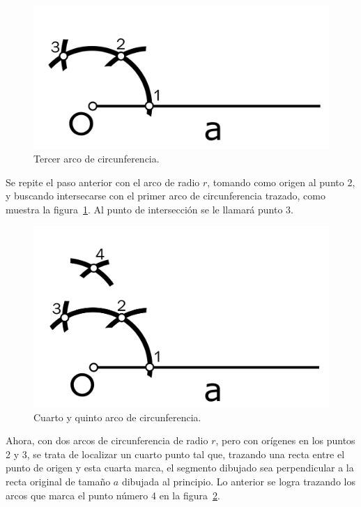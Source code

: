 \begin{figure}[H]
\centering
\includegraphics[scale=0.95]{Figures/Cuad4}
\caption[Tercer arco de circunferencia.]{Tercer arco de circunferencia.}
\label{fig:TrazFig4}
\end{figure}

Se repite el paso anterior con el arco de radio $r$, tomando como origen al punto 2, y buscando intersecarse con el primer arco de circunferencia trazado, como muestra la figura~\ref{fig:TrazFig4}. Al punto de intersección se le llamará punto 3.

\begin{figure}[H]
\centering
\includegraphics[scale=0.85]{Figures/Cuad5}
\caption[Cuarto y quinto arco de circunferencia.]{Cuarto y quinto arco de circunferencia.}
\label{fig:TrazFig5}
\end{figure}

Ahora, con dos arcos de circunferencia de radio $r$, pero con orígenes en los puntos 2 y 3, se trata de localizar un cuarto punto tal que, trazando una recta entre el punto de origen y esta cuarta marca, el segmento dibujado sea perpendicular a la recta original de tamaño $a$ dibujada al principio. Lo anterior se logra trazando los arcos que marca el punto número 4 en la figura~\ref{fig:TrazFig5}.

